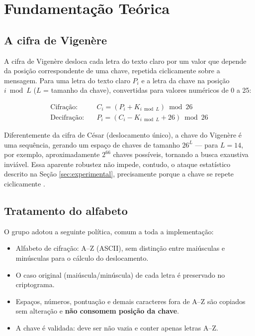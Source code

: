 \documentclass[conference]{IEEEtran}
\begin{document}
\section{Fundamentação Teórica}
\label{sec:fundamentacao}

\subsection{A cifra de Vigenère}

A cifra de Vigenère desloca cada letra do texto claro por um valor
que depende da posição correspondente de uma chave, repetida
ciclicamente sobre a mensagem. Para uma letra do texto claro $P_i$ e
a letra da chave na posição $i \bmod L$ ($L$ = tamanho da chave),
convertidas para valores numéricos de 0 a 25:

\begin{align}
\text{Cifração:}\quad   & C_i = (P_i + K_{i \bmod L}) \bmod 26 \\
\text{Decifração:}\quad & P_i = (C_i - K_{i \bmod L} + 26) \bmod 26
\end{align}

Diferentemente da cifra de César (deslocamento único), a chave do
Vigenère é uma sequência, gerando um espaço de chaves de tamanho
$26^L$ --- para $L = 14$, por exemplo, aproximadamente $2^{66}$
chaves possíveis, tornando a busca exaustiva inviável. Essa aparente
robustez não impede, contudo, o ataque estatístico descrito na Seção
\ref{sec:experimental}, precisamente porque a chave se repete
ciclicamente \cite{fundamentos}.

\subsection{Tratamento do alfabeto}

O grupo adotou a seguinte política, comum a toda a implementação:

\begin{itemize}
\item Alfabeto de cifração: A--Z (ASCII), sem distinção entre
  maiúsculas e minúsculas para o cálculo do deslocamento.
\item O caso original (maiúscula/minúscula) de cada letra é
  preservado no criptograma.
\item Espaços, números, pontuação e demais caracteres fora de A--Z
  são copiados sem alteração e \textbf{não consomem posição da
  chave}.
\item A chave é validada: deve ser não vazia e conter apenas letras
  A--Z.
\end{itemize}
\end{document}
